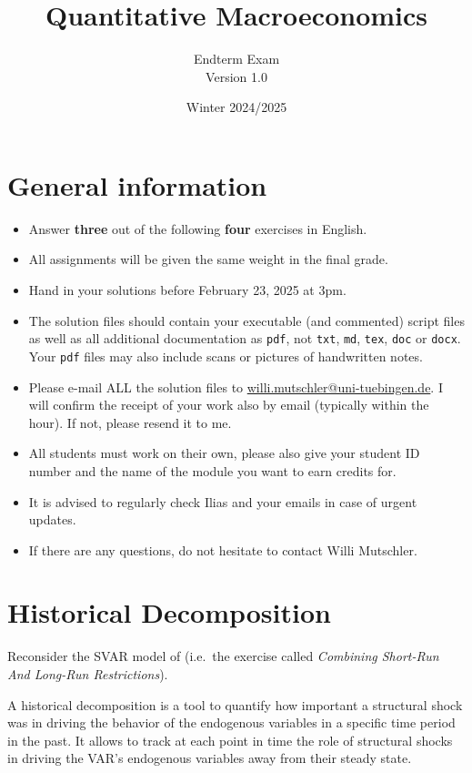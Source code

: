 \documentclass{article}
\begin{document}
	
\title{Quantitative Macroeconomics}
\author{Endterm Exam\\Version 1.0}
\date{Winter 2024/2025}

\maketitle

\section*{General information}
\begin{itemize}
	\item Answer \textbf{three} out of the following \textbf{four} exercises in English.
	\item All assignments will be given the same weight in the final grade.
	\item Hand in your solutions before February 23, 2025 at 3pm.
	\item The solution files should contain your executable (and commented) script files
		as well as all additional documentation as \texttt{pdf}, not \texttt{txt}, \texttt{md}, \texttt{tex}, \texttt{doc} or \texttt{docx}.
	Your \texttt{pdf} files may also include scans or pictures of handwritten notes.
	\item Please e-mail ALL the solution files to \url{willi.mutschler@uni-tuebingen.de}.
	I will confirm the receipt of your work also by email (typically within the hour). If not, please resend it to me.
	\item All students must work on their own, please also give your student ID number and the name of the module you want to earn credits for.
	\item It is advised to regularly check Ilias and your emails in case of urgent updates.
	\item If there are any questions, do not hesitate to contact Willi Mutschler.
\end{itemize}

\newpage

\section[Historical Decomposition]{Historical Decomposition}
Reconsider the SVAR model of \textcite{Rubio-Ramirez.Waggoner.Zha_2010_StructuralVectorAutoregressions}
  (i.e.\ the exercise called \emph{Combining Short-Run And Long-Run Restrictions}).

A historical decomposition is a tool to quantify how important a structural shock was
  in driving the behavior of the endogenous variables in a specific time period in the past.
It allows to track at each point in time the role of structural shocks
  in driving the VAR's endogenous variables away from their steady state.
\end{document}
